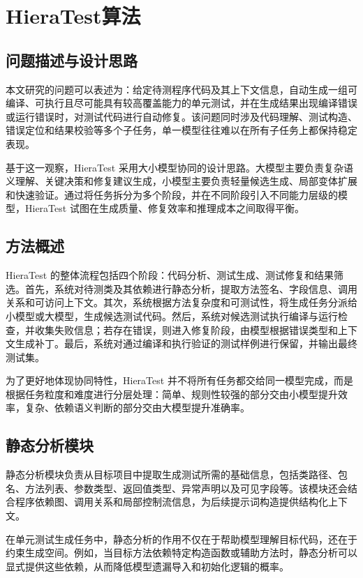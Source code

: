 \cleardoublepage

\section{\textbf{HieraTest}算法}

\subsection{问题描述与设计思路}

本文研究的问题可以表述为：给定待测程序代码及其上下文信息，自动生成一组可编译、可执行且尽可能具有较高覆盖能力的单元测试，并在生成结果出现编译错误或运行错误时，对测试代码进行自动修复。该问题同时涉及代码理解、测试构造、错误定位和结果校验等多个子任务，单一模型往往难以在所有子任务上都保持稳定表现。

基于这一观察，HieraTest 采用大小模型协同的设计思路。大模型主要负责复杂语义理解、关键决策和修复建议生成，小模型主要负责轻量候选生成、局部变体扩展和快速验证。通过将任务拆分为多个阶段，并在不同阶段引入不同能力层级的模型，HieraTest 试图在生成质量、修复效率和推理成本之间取得平衡。

\subsection{方法概述}

HieraTest 的整体流程包括四个阶段：代码分析、测试生成、测试修复和结果筛选。首先，系统对待测类及其依赖进行静态分析，提取方法签名、字段信息、调用关系和可访问上下文。其次，系统根据方法复杂度和可测试性，将生成任务分派给小模型或大模型，生成候选测试代码。然后，系统对候选测试执行编译与运行检查，并收集失败信息；若存在错误，则进入修复阶段，由模型根据错误类型和上下文生成补丁。最后，系统对通过编译和执行验证的测试样例进行保留，并输出最终测试集。

为了更好地体现协同特性，HieraTest 并不将所有任务都交给同一模型完成，而是根据任务粒度和难度进行分层处理：简单、规则性较强的部分交由小模型提升效率，复杂、依赖语义判断的部分交由大模型提升准确率。

\subsection{静态分析模块}

静态分析模块负责从目标项目中提取生成测试所需的基础信息，包括类路径、包名、方法列表、参数类型、返回值类型、异常声明以及可见字段等。该模块还会结合程序依赖图、调用关系和局部控制流信息，为后续提示词构造提供结构化上下文。

在单元测试生成任务中，静态分析的作用不仅在于帮助模型理解目标代码，还在于约束生成空间。例如，当目标方法依赖特定构造函数或辅助方法时，静态分析可以显式提供这些依赖，从而降低模型遗漏导入和初始化逻辑的概率。

